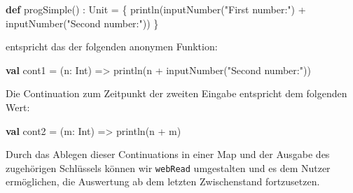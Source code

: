 \documentclass[]{article}
\newenvironment{Shaded}{}{}
\newcommand{\FunctionTok}[1]{\textcolor[rgb]{0.02,0.16,0.49}{#1}}
\newcommand{\KeywordTok}[1]{\textcolor[rgb]{0.00,0.44,0.13}{\textbf{#1}}}
\newcommand{\NormalTok}[1]{#1}
\newcommand{\StringTok}[1]{\textcolor[rgb]{0.25,0.44,0.63}{#1}}
\begin{document}
\begin{Shaded}
\begin{Highlighting}[]
\KeywordTok{def} \FunctionTok{progSimple}\NormalTok{() : Unit = \{}
  \FunctionTok{println}\NormalTok{(}\FunctionTok{inputNumber}\NormalTok{(}\StringTok{"First number:"}\NormalTok{) + }\FunctionTok{inputNumber}\NormalTok{(}\StringTok{"Second number:"}\NormalTok{))}
\NormalTok{\}}
\end{Highlighting}
\end{Shaded}

entspricht das der folgenden anonymen Funktion:

\begin{Shaded}
\begin{Highlighting}[]
\KeywordTok{val}\NormalTok{ cont1 = (n: Int) =\textgreater{} }\FunctionTok{println}\NormalTok{(n + }\FunctionTok{inputNumber}\NormalTok{(}\StringTok{"Second number:"}\NormalTok{))}
\end{Highlighting}
\end{Shaded}

Die Continuation zum Zeitpunkt der zweiten Eingabe entspricht dem
folgenden Wert:

\begin{Shaded}
\begin{Highlighting}[]
\KeywordTok{val}\NormalTok{ cont2 = (m: Int) =\textgreater{} }\FunctionTok{println}\NormalTok{(n + m)}
\end{Highlighting}
\end{Shaded}

Durch das Ablegen dieser Continuations in einer Map und der Ausgabe des
zugehörigen Schlüssels können wir \texttt{webRead} umgestalten und es
dem Nutzer ermöglichen, die Auswertung ab dem letzten Zwischenstand
fortzusetzen.
\end{document}

